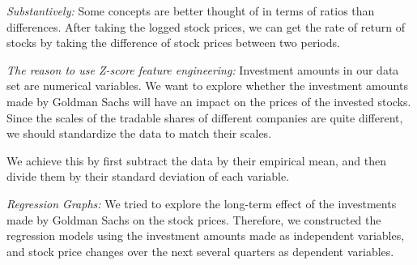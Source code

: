 \documentclass{article}
\begin{document}
\begin{multicols}{2}
\textit{Substantively:} Some concepts are better thought of in terms of ratios than differences. After taking the logged stock prices, we can get the rate of return of stocks by taking the difference of stock prices between two periods.

\textit{The reason to use Z-score feature engineering:}
Investment amounts in our data set are numerical variables. We want to explore whether the investment amounts made by Goldman Sachs will have an impact on the prices of the invested stocks. Since the scales of the tradable shares of different companies are quite different, we should standardize the data to match their scales.

We achieve this by first subtract the data by their empirical mean, and then divide them by their standard deviation of each variable.

\textit{Regression Graphs:}
We tried to explore the long-term effect of the investments made by Goldman Sachs on the stock prices. Therefore, we constructed the regression models using the investment amounts made as independent variables, and stock price changes over the next several quarters as dependent variables. 


\end{multicols}
\end{document}
